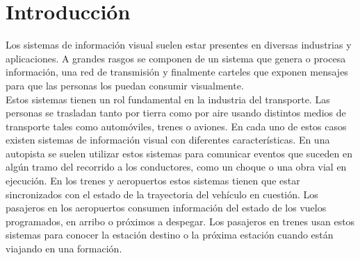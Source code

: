 
\newcommand{\keyword}[1]{\textbf{#1}}
\newcommand{\tabhead}[1]{\textbf{#1}}
\newcommand{\code}[1]{\texttt{#1}}
\newcommand{\file}[1]{\texttt{\bfseries#1}}
\newcommand{\option}[1]{\texttt{\itshape#1}}
\newcommand{\grados}{$^{\circ}$}



\chapter{Introducción} %
\label{Chapter1} %
\label{Intro}

Los sistemas de información visual suelen estar presentes en diversas industrias y aplicaciones. A grandes rasgos se componen de un sistema que genera o procesa información, una red de transmisión y finalmente carteles que exponen mensajes para que las personas los puedan consumir visualmente.\\

 Estos sistemas tienen un rol fundamental en la industria del transporte. Las personas se trasladan tanto por tierra como por aire usando distintos medios de transporte tales como automóviles, trenes o aviones. En cada uno de estos casos existen sistemas de información visual con diferentes características. En una autopista se suelen utilizar estos sistemas para comunicar eventos que suceden en algún tramo del recorrido a los conductores, como un choque o una obra vial en ejecución. En los trenes y aeropuertos estos sistemas tienen que estar sincronizados con el estado de la trayectoria del vehículo en cuestión. Los pasajeros en los aeropuertos consumen información del estado de los vuelos programados, en arribo o próximos a despegar. Los pasajeros en trenes usan estos sistemas para conocer la estación destino o la próxima estación cuando están viajando en una formación. \\

